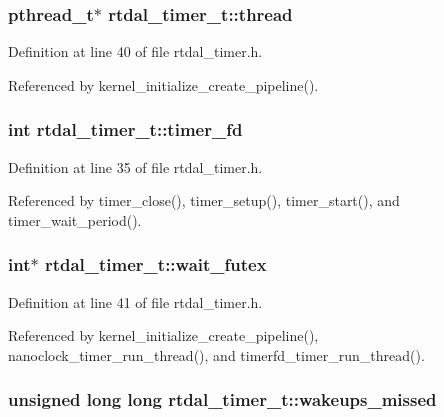 \subsubsection[{thread}]{\setlength{\rightskip}{0pt plus 5cm}pthread\-\_\-t$\ast$ rtdal\-\_\-timer\-\_\-t\-::thread}\label{structrtdal__timer__t_a935b3c9da18c2f0a39588f4bba9e13d6}


Definition at line 40 of file rtdal\-\_\-timer.\-h.



Referenced by kernel\-\_\-initialize\-\_\-create\-\_\-pipeline().

\subsubsection[{timer\-\_\-fd}]{\setlength{\rightskip}{0pt plus 5cm}int rtdal\-\_\-timer\-\_\-t\-::timer\-\_\-fd}\label{structrtdal__timer__t_aa7bf664cf9401e16c226f326e0672dfd}


Definition at line 35 of file rtdal\-\_\-timer.\-h.



Referenced by timer\-\_\-close(), timer\-\_\-setup(), timer\-\_\-start(), and timer\-\_\-wait\-\_\-period().

\subsubsection[{wait\-\_\-futex}]{\setlength{\rightskip}{0pt plus 5cm}int$\ast$ rtdal\-\_\-timer\-\_\-t\-::wait\-\_\-futex}\label{structrtdal__timer__t_a5f908aa671f7e3adffbc9096c1dc415a}


Definition at line 41 of file rtdal\-\_\-timer.\-h.



Referenced by kernel\-\_\-initialize\-\_\-create\-\_\-pipeline(), nanoclock\-\_\-timer\-\_\-run\-\_\-thread(), and timerfd\-\_\-timer\-\_\-run\-\_\-thread().

\subsubsection[{wakeups\-\_\-missed}]{\setlength{\rightskip}{0pt plus 5cm}unsigned long long rtdal\-\_\-timer\-\_\-t\-::wakeups\-\_\-missed}\label{structrtdal__timer__t_ad605ac13eeb5dd9ba9715685e965e019}


